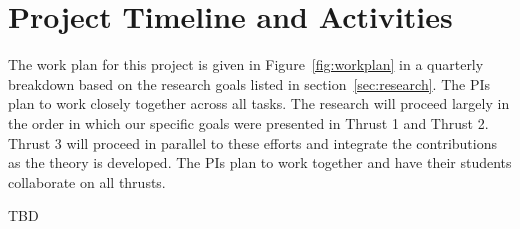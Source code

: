 
\section{Project Timeline and Activities}
\label{sec:man}

The work plan for this project is given in Figure~\ref{fig:workplan} in a
quarterly breakdown based on the research goals listed in
section~\ref{sec:research}.   The PIs plan to work closely together across all tasks. The
research  will proceed largely in the order in which our specific goals were presented in Thrust 1 and Thrust 2.  Thrust 3 will proceed in parallel to these efforts
and integrate the contributions as the theory is developed.  The PIs plan to work together and have their students collaborate on all thrusts. 

\begin{figure*}
TBD
\caption{The proposed work plan split into quarterly tasks for the duration of the grant period.}
\label{fig:workplan}
\end{figure*}





